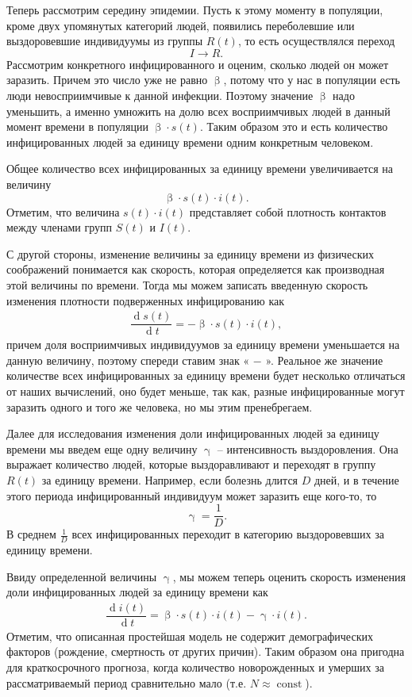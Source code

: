 \documentclass[a4paper, 14pt]{extreport}
\renewcommand{\beta}{\upbeta}
\renewcommand{\gamma}{\upgamma}
\renewcommand{\d}{\operatorname{d}}
\begin{document}
	Теперь рассмотрим середину эпидемии. Пусть к этому моменту в популяции, кроме двух упомянутых категорий людей, появились переболевшие или выздоровевшие индивидуумы из группы $R(t)$, то есть осуществлялся переход $$I \to R.$$ Рассмотрим конкретного инфицированного и оценим, сколько людей он может заразить. Причем это число уже не равно $\beta$, потому что у нас в популяции есть люди
	невосприимчивые к данной инфекции. Поэтому значение $\beta$ надо уменьшить, а именно умножить на долю всех восприимчивых людей в данный момент времени в популяции $\beta \cdot s(t)$. Таким образом это и есть количество инфицированных людей за единицу времени одним конкретным человеком. 
	
	Общее количество всех инфицированных за единицу времени увеличивается на
	величину $$\beta \cdot s(t) \cdot i(t).$$
	Отметим, что величина $s(t)\cdot i(t)$
	представляет собой плотность контактов между членами групп
	$S(t)$ и $I(t)$.
	
	С другой стороны, изменение величины за единицу времени из физических соображений понимается как скорость, которая определяется как производная этой величины по времени. Тогда мы можем записать введенную  скорость изменения плотности подверженных инфицированию как 
	\begin{eqnarray}
		\label{s-comp}
		\dfrac {\d s(t)}{\d t} = -\beta \cdot s(t) \cdot i(t),
	\end{eqnarray}
	причем доля восприимчивых индивидуумов за единицу времени
	уменьшается на данную величину, поэтому спереди ставим знак « $-$ ».
	Реальное же значение количестве всех инфицированных за единицу времени будет несколько отличаться от наших вычислений, оно будет меньше, так как, разные инфицированные могут заразить одного и того же человека, но мы этим пренебрегаем. 
	
	Далее для исследования изменения доли инфицированных людей за единицу времени мы введем еще одну величину $\gamma$ -- интенсивность выздоровления. Она выражает количество людей, которые
	выздоравливают и переходят в группу $R(t)$ за единицу времени. Например, если болезнь длится $D$ дней, и в течение этого
	периода инфицированный индивидуум может заразить еще кого-то, то $$\gamma = \dfrac 1D.$$
	В среднем $\frac 1D$ всех инфицированных переходит в категорию выздоровевших за единицу времени.
	
	Ввиду определенной величины $\gamma$, мы можем теперь оценить скорость изменения доли инфицированных людей за единицу времени как 
	\begin{eqnarray}
		\label{i-comp}
		\dfrac{\d i(t)}{\d t} = \beta \cdot s(t)\cdot i(t) - \gamma\cdot i(t).
	\end{eqnarray}
	Отметим, что описанная простейшая модель не содержит демографических
	факторов (рождение, смертность от других причин). Таким образом она пригодна для
	краткосрочного прогноза, когда количество новорожденных и умерших за
	рассматриваемый период сравнительно мало (т.е. $N\approx \operatorname{const}$).
	
\end{document}
